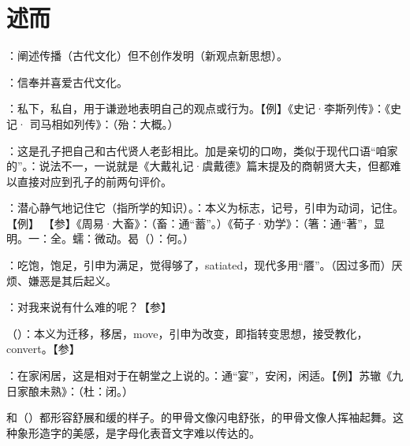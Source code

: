 \chapter{述而}

{
\item {}：阐述传播（古代文化）但不创作发明（新观点新思想）。
\item {}：信奉并喜爱古代文化。
\item {}：私下，私自，用于谦逊地表明自己的观点或行为。【例】《史记·李斯列传》：《史记· 司马相如列传》：（殆：大概。）
\item {}：这是孔子把自己和古代贤人老彭相比。加是亲切的口吻，类似于现代口语“咱家的”。：说法不一，一说就是《大戴礼记·虞戴德》篇末提及的商朝贤大夫，但都难以直接对应到孔子的前两句评价。%
}
{}


{
\item {}：潜心静气地记住它（指所学的知识）。：本义为标志，记号，引申为动词，记住。【例】 【参】《周易·大畜》：（畜：通“蓄”。）《荀子·劝学》：（箸：通“著”，显明。一：全。蠕：微动。曷（）：何。）
\item {}：吃饱，饱足，引申为满足，觉得够了，satiated，现代多用“餍”。（因过多而）厌烦、嫌恶是其后起义。
\item {}：对我来说有什么难的呢？【参】 %
}
{}


{
\item {}（）：本义为迁移，移居，move，引申为改变，即指转变思想，接受教化，convert。【参】
}
{}


{
\item {}：在家闲居，这是相对于在朝堂之上说的。：通“宴”，安闲，闲适。【例】苏辙《九日家酿未熟》：（杜：闭。） %
\item {}和（）都形容舒展和缓的样子。的甲骨文像闪电舒张，的甲骨文像人挥袖起舞。这种象形造字的美感，是字母化表音文字难以传达的。%
}
{}


